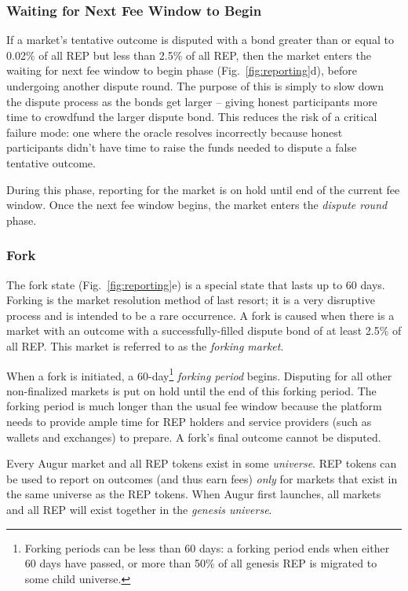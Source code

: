 \documentclass[floatfix,reprint,nofootinbib,amsmath,amssymb,epsfig,pre,floats,letterpaper,groupedaffiliation]{revtex4-1}
\theoremstyle{definition}
\theoremstyle{definition}
\begin{document}
\subsubsection{Waiting for Next Fee Window to Begin}

If a market's tentative outcome is disputed with a bond greater than or equal to 0.02\% of all REP but less than 2.5\% of all REP, then the market enters the waiting for next fee window to begin phase (Fig.~\ref{fig:reporting}d), before undergoing another dispute round. The purpose of this is simply to slow down the dispute process as the bonds get larger -- giving honest participants more time to crowdfund the larger dispute bond. This reduces the risk of a critical failure mode: one where the oracle resolves incorrectly because honest participants didn't have time to raise the funds needed to dispute a false tentative outcome.

During this phase, reporting for the market is on hold until end of the current fee window.  Once the next fee window begins, the market enters the \textit{dispute round} phase.

\subsubsection{Fork}\label{section:fork}

The fork state (Fig.~\ref{fig:reporting}e) is a special state that lasts up to 60 days.  Forking is the market resolution method of last resort; it is a very disruptive process and is intended to be a rare occurrence.  A fork is caused when there is a market with an outcome with a successfully-filled dispute bond of at least 2.5\% of all REP.  This market is referred to as the \textit{forking market}.

When a fork is initiated, a 60-day\footnote{Forking periods can be less than 60 days: a forking period ends when either 60 days have passed, or more than 50\% of all genesis REP is migrated to some child universe.} \textit{forking period} begins.  Disputing for all other non-finalized markets is put on hold until the end of this forking period.  The forking period is much longer than the usual fee window because the platform needs to provide ample time for REP holders and service providers (such as wallets and exchanges) to prepare.  A fork's final outcome cannot be disputed.

Every Augur market and all REP tokens exist in some \textit{universe}.  REP tokens can be used to report on outcomes (and thus earn fees) \textit{only} for markets that exist in the same universe as the REP tokens.  When Augur first launches, all markets and all REP will exist together in the \textit{genesis universe}.
\end{document}
